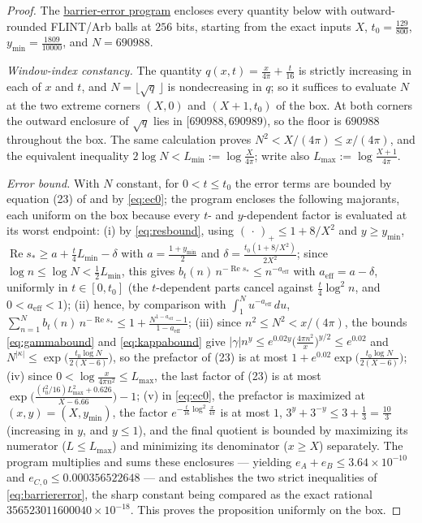 \documentclass[11pt]{article}
\theoremstyle{definition}
\newcommand{\programlink}[2]{\href{https://github.com/judegomila/dbn-lambda-01787854-candidate-audit/blob/6222740efae58d773a70ff929cf12a34932d2af0/#1}{#2}}
\DeclareMathOperator{\Rea}{Re}
\begin{document}
\begin{proof}
The
\programlink{independent/prop62/prop62_proof.c}{barrier-error program}
encloses every quantity below with outward-rounded FLINT/Arb balls at
$256$ bits, starting from the exact inputs $X$,
$t_0=\frac{129}{800}$, $y_{\min}=\frac{1809}{10000}$, and
$N=690988$.

\emph{Window-index constancy.} The quantity
$q(x,t)=\frac{x}{4\pi}+\frac t{16}$ is strictly increasing in each
of $x$ and $t$, and $N=\lfloor\sqrt{q}\,\rfloor$ is nondecreasing
in $q$; so it suffices to evaluate $N$ at the two extreme corners
$(X,0)$ and $(X+1,t_0)$ of the box. At both corners the outward enclosure of
$\sqrt q$ lies in $[690988,690989)$, so the floor is $690988$ throughout
the box. The same calculation proves
$N^2<X/(4\pi)\le x/(4\pi)$, and the equivalent inequality
$2\log N<L_{\min}:=\log\frac X{4\pi}$; write also
$L_{\max}:=\log\frac{X+1}{4\pi}$.

\emph{Error bound.} With $N$ constant, for $0<t\le t_0$ the error
terms are bounded by equation (23) of \cite{Polymath} and by
\eqref{eq:ec0}; the program encloses the following majorants, each
uniform on the box because every $t$- and $y$-dependent factor is
evaluated at its worst endpoint:
(i) by \eqref{eq:resbound}, using $(\,\cdot\,)_+\le1+8/X^2$ and
$y\ge y_{\min}$,
$\Rea s_*\ge a+\frac t4L_{\min}-\delta$ with
$a=\frac{1+y_{\min}}2$ and
$\delta=\frac{t_0(1+8/X^2)}{2X^2}$; since
$\log n\le\log N<\frac12L_{\min}$, this gives
$b_t(n)\,n^{-\Rea s_*}\le n^{-a_{\mathrm{eff}}}$ with
$a_{\mathrm{eff}}=a-\delta$, uniformly in $t\in[0,t_0]$ (the
$t$-dependent parts cancel against $\frac t4\log^2n$, and
$0<a_{\mathrm{eff}}<1$);
(ii) hence, by comparison with $\int_1^Nu^{-a_{\mathrm{eff}}}\,du$,
$\sum_{n=1}^{N}b_t(n)\,n^{-\Rea s_*}\le
1+\frac{N^{1-a_{\mathrm{eff}}}-1}{1-a_{\mathrm{eff}}}$;
(iii) since $n^2\le N^2<x/(4\pi)$, the bounds \eqref{eq:gammabound}
and \eqref{eq:kappabound} give
$|\gamma|n^y\le e^{0.02y}\bigl(\frac{4\pi n^2}x\bigr)^{y/2}\le
e^{0.02}$ and
$N^{|\kappa|}\le\exp\bigl(\frac{t_0\log N}{2(X-6)}\bigr)$, so the
prefactor of (23) is at most
$1+e^{0.02}\exp\bigl(\frac{t_0\log N}{2(X-6)}\bigr)$;
(iv) since $0<\log\frac x{4\pi n^2}\le L_{\max}$, the last factor
of (23) is at most
$\exp\bigl(\frac{(t_0^2/16)L_{\max}^2+0.626}{X-6.66}\bigr)-1$;
(v) in \eqref{eq:ec0}, the prefactor is maximized at
$(x,y)=(X,y_{\min})$, the factor $e^{-\frac t{16}\log^2\frac x{4\pi}}$
is at most $1$, $3^y+3^{-y}\le3+\frac13=\frac{10}3$ (increasing in
$y$, and $y\le1$), and the final quotient is bounded by maximizing
its numerator ($L\le L_{\max}$) and minimizing its denominator
($x\ge X$) separately.
The program multiplies and sums these enclosures --- yielding
$e_A+e_B\le3.64\times10^{-10}$ and
$e_{C,0}\le0.000356522648$ --- and establishes the two strict
inequalities of \eqref{eq:barriererror}, the sharp constant being
compared as the exact rational $356523011600040\times10^{-18}$.
This proves the proposition uniformly on the box.
\end{proof}
\end{document}
